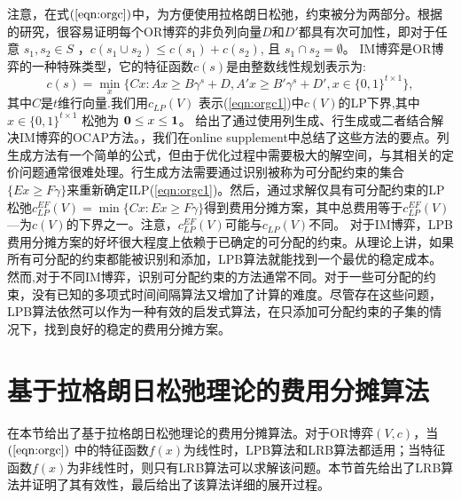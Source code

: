 \documentclass[UTF8]{article}
\begin{document}
注意，在式$(\ref{eqn:orgc})$中，为方便使用拉格朗日松弛，约束被分为两部分。根据\cite{Caprara2010LPB}的研究，很容易证明每个OR博弈的非负列向量$D$和$D'$都具有次可加性，即对于任意 $s_1,s_2 \in S$ ，$c(s_1 \cup s_2) \leq c(s_1) + c(s_2)$, 且 $s_1 \cap s_2 = \emptyset$。
IM博弈是OR博弈的一种特殊类型，它的特征函数$c(s) $是由整数线性规划表示为:
\begin{equation}\label{eqn:orgc1}
c(s) = \min_{x} \big\{ Cx:Ax \geq B\gamma^s + D, A'x \geq B'\gamma^s + D', x \in \{0,1\}^{t \times 1} \big\},
\end{equation}
其中$C$是$t$维行向量.我们用$c_{LP}(V)$ 表示(\ref{eqn:orgc1})中$c(V)$的LP下界,其中$x \in \{0,1\}^{t \times 1}$ 松弛为 ${\bf 0}\leq x \leq {\bf 1}$。
\cite{Caprara2010LPB}给出了通过使用列生成、行生成或二者结合解决IM博弈的OCAP方法。，我们在online supplement中总结了这些方法的要点。列生成方法有一个简单的公式，但由于优化过程中需要极大的解空间，与其相关的定价问题通常很难处理。行生成方法需要通过识别被称为可分配约束的集合$\{ Ex \geq F\gamma\}$来重新确定ILP(\ref{eqn:orgc1})。然后，通过求解仅具有可分配约束的LP松弛$c_{LP}^{EF}(V)=\min\{ Cx : Ex \geq F\gamma\}$得到费用分摊方案，其中总费用等于$c_{LP}^{EF}(V)$—为$c(V)$的下界之一。注意，$c_{LP}^{EF}(V)$可能与$c_{LP}(V)$不同。
对于IM博弈，LPB费用分摊方案的好坏很大程度上依赖于已确定的可分配的约束。从理论上讲，如果所有可分配的约束都能被识别和添加，LPB算法就能找到一个最优的稳定成本。然而,对于不同IM博弈，识别可分配约束的方法通常不同。对于一些可分配的约束，没有已知的多项式时间间隔算法又增加了计算的难度。尽管存在这些问题，LPB算法依然可以作为一种有效的启发式算法，在只添加可分配约束的子集的情况下，找到良好的稳定的费用分摊方案。

\section{基于拉格朗日松弛理论的费用分摊算法} \label{section:lrbmethod}
   在本节给出了基于拉格朗日松弛理论的费用分摊算法。对于OR博弈$(V,c)$，当 $(\ref{eqn:orgc})$ 中的特征函数$f(x)$为线性时，LPB算法和LRB算法都适用；当特征函数$f(x)$为非线性时，则只有LRB算法可以求解该问题。本节首先给出了LRB算法并证明了其有效性，最后给出了该算法详细的展开过程。
\end{document}
